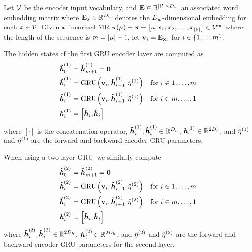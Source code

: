 Let $\mathcal{V}$ be the encoder input vocabulary, and  $\mathbf{E} \in
\mathbb{R}^{{\lvert \mathcal{V} \rvert} \times {D_w}}$ an associated word embedding matrix
where $\mathbf{E}_{x} \in \mathbb{R}^{{D_w}}$ denotes the ${D_w}$-dimensional
embedding for each $x \in \mathcal{V}$. 
Given a linearized MR $\pi(\mu) = \mathbf{x}= \left[ a, x_1, x_2, \ldots,
x_{{\lvert \mu \rvert}}\right] \in \mathcal{V}^{m}$ where the length
of the sequence is $m = {\lvert \mu \rvert} + 1$,
let $\mathbf{v}_i = \mathbf{E}_{\mathbf{x}_i}$ for $i \in \{1, \ldots m\}$.




The hidden states of the first GRU encoder layer are
computed as
\begin{align*}
    \boldsymbol{\hat{h}}^{(1)}_0 & = \boldsymbol{\check{h}}^{(1)}_{m + 1} = \mathbf{0} \\
    \boldsymbol{\hat{h}}^{(1)}_i &= \operatorname{GRU}\left(\mathbf{v}_i, \boldsymbol{\hat{h}}^{(1)}_{i-1};
            \hat{\eta}^{(1)}\right) &
    \textrm{for $i \in 1,\ldots,m$}\\
    \boldsymbol{\check{h}}^{(1)}_i &= \operatorname{GRU}\left(\mathbf{v}_i, \boldsymbol{\check{h}}^{(1)}_{i+1};
            \check{\eta}^{(1)}\right) &
    \textrm{for $i \in m,\ldots,1$}\\
    \boldsymbol{h}_i^{(1)} & = \left[\boldsymbol{\hat{h}}_i, \boldsymbol{\check{h}}_i\right]
\end{align*}
where $\left[\cdot\right]$ is the concatenation operator, $\boldsymbol{\hat{h}}^{(1)}_i,\boldsymbol{\check{h}}^{(1)}_i \in \mathbb{R}^{{D_h}}$, $\boldsymbol{h}^{(1)}_i \in  \mathbb{R}^{2{D_h}}$,
and $\hat{\eta}^{(1)}$ and $\check{\eta}^{(1)}$ are the forward and backward
encoder GRU parameters.

When using a two layer GRU, we similarly compute
\begin{align*}
    \boldsymbol{\hat{h}}^{(2)}_0 & =\boldsymbol{\check{h}}^{(2)}_{m+1}  = \mathbf{0} \\
    \boldsymbol{\hat{h}}^{(2)}_i &= \operatorname{GRU}\left(\mathbf{v}_i, \boldsymbol{\hat{h}}^{(2)}_{i-1};
            \hat{\eta}^{(2)}\right) &
    \textrm{for $i \in 1,\ldots,m$}\\
    \boldsymbol{\check{h}}^{(2)}_i &= \operatorname{GRU}\left(\mathbf{v}_i, \boldsymbol{\check{h}}^{(2)}_{i+1};
            \check{\eta}^{(2)}\right) &
    \textrm{for $i \in m,\ldots,1$}\\
    \boldsymbol{h}_i^{(2)} & = \left[\boldsymbol{\hat{h}}_i, \boldsymbol{\check{h}}_i\right]
\end{align*}
where $\boldsymbol{\hat{h}}^{(2)}_i,\boldsymbol{\check{h}}^{(2)}_i \in \mathbb{R}^{2{D_h}}$, $\boldsymbol{h}^{(2)}_i \in  \mathbb{R}^{2{D_h}}$,
and $\hat{\eta}^{(2)}$ and $\check{\eta}^{(2)}$ are the forward and backward
encoder GRU parameters for the second layer.

